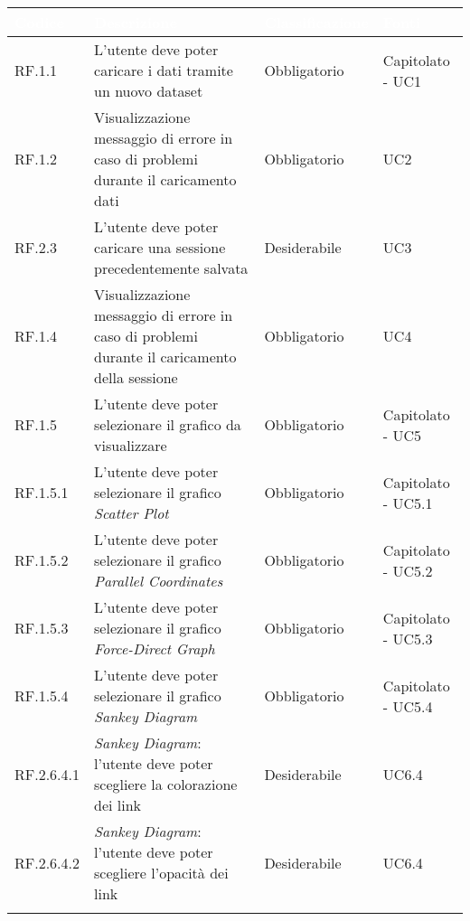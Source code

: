 \begin{center}
  \centering
  \begin{longtable}{|L{1,5cm}|C{5,5cm}|C{3cm}|C{2cm}|}
    \hline
    \textcolor[HTML]{FFFFFF}{\textbf{Codice}} & \textcolor[HTML]{FFFFFF}{\textbf{Descrizione}} & \textcolor[HTML]{FFFFFF}{\textbf{Classificazione}} & \textcolor[HTML]{FFFFFF}{\textbf{Fonti}}
    \\ \hline
    RF.1.1 & L'utente deve poter caricare i dati tramite un nuovo dataset & Obbligatorio & Capitolato - UC1 \\ \hline
    RF.1.2 & Visualizzazione messaggio di errore in caso di problemi durante il caricamento dati & Obbligatorio & UC2 \\ \hline
    RF.2.3 & L'utente deve poter caricare una sessione precedentemente salvata & Desiderabile & UC3 \\ \hline
    RF.1.4 & Visualizzazione messaggio di errore in caso di problemi durante il caricamento della sessione & Obbligatorio & UC4 \\ \hline
    RF.1.5 & L'utente deve poter selezionare il grafico da visualizzare & Obbligatorio & Capitolato - UC5 \\ \hline
    RF.1.5.1 & L'utente deve poter selezionare il grafico \textit{Scatter Plot} & Obbligatorio & Capitolato - UC5.1 \\ \hline
    RF.1.5.2 & L'utente deve poter selezionare il grafico \textit{Parallel Coordinates} & Obbligatorio & Capitolato - UC5.2 \\ \hline
    RF.1.5.3 & L'utente deve poter selezionare il grafico \textit{Force-Direct Graph} & Obbligatorio & Capitolato - UC5.3 \\ \hline
    RF.1.5.4 & L'utente deve poter selezionare il grafico \textit{Sankey Diagram} & Obbligatorio & Capitolato - UC5.4 \\ \hline
    RF.2.6.4.1 & \textit{Sankey Diagram}: l'utente deve poter scegliere la colorazione dei link & Desiderabile & UC6.4 \\ \hline
    RF.2.6.4.2 & \textit{Sankey Diagram}: l'utente deve poter scegliere l'opacità dei link & Desiderabile & UC6.4 \\ \hline

\end{longtable}
\end{center}
